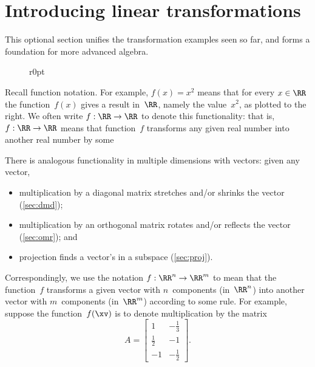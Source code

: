 

\section{Introducing linear transformations}
\label{sec:ilt}
\secttoc

This optional section unifies the transformation examples seen so far, and forms a foundation for more advanced algebra. 

\begin{figure}r{0pt}
\end{figure}
Recall function notation.
For example, \(f(x)=x^2\) means that for every \(x\in\RR\) the function~\(f(x)\) gives a result in~\(\RR\), namely the value~\(x^2\), as plotted to the right.  
We often write \(f:\RR\to\RR\) to denote this functionality: that is, \(f:\RR\to\RR\) means that function~\(f\) transforms any given real number into another real number by some 

There is analogous functionality in multiple dimensions with vectors: given any vector, 
\begin{itemize}
\item multiplication by a diagonal matrix stretches and/or shrinks the vector (\cref{sec:dmd});
\item multiplication by an orthogonal matrix rotates and/or reflects the vector (\cref{sec:omr});
and \item projection finds a vector's  in a subspace (\cref{sec:proj}).
\end{itemize}
Correspondingly, we use the notation \(f:\RR^n\to\RR^m\) to mean that the function~\(f\) transforms a given vector with \(n\)~components (in~\(\RR^n\)) into another vector with \(m\)~components (in~\(\RR^m\)) according to some rule. 
For example, suppose the function~\(f(\xv)\) is to denote multiplication by the matrix
\begin{equation*}
A=\begin{bmatrix} 1&-\frac13\\\frac12&-1\\-1&-\frac12 \end{bmatrix}.
\end{equation*}

